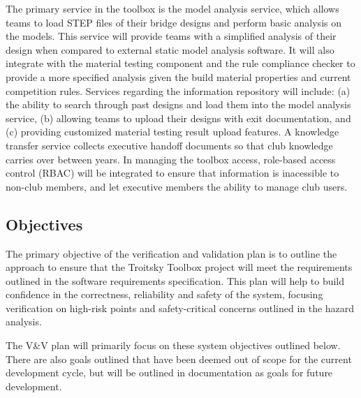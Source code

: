 \documentclass[12pt, titlepage]{article}
\begin{document}
The primary service in the toolbox is the model analysis service, which allows teams to load STEP files of their bridge 
designs and perform basic analysis on the models. This service will provide teams with a simplified analysis of their design when compared to 
external static model analysis software. It will also integrate with the material testing component and the rule compliance checker to provide a more specified analysis given the 
build material properties and current competition rules. Services regarding the information repository will include: (a) the ability to search through past designs and load them into 
the model analysis service, (b) allowing teams to upload their designs with exit documentation, and (c) providing customized material testing result upload features. A knowledge transfer 
service collects executive handoff documents so that club knowledge carries over between years.
In managing the toolbox access, role-based access control (RBAC) will be integrated to ensure that information is inacessible to non-club members, and let executive members 
the ability to manage club users.

\subsection{Objectives}

The primary objective of the verification and validation plan is to outline the approach to ensure that the Troitsky Toolbox 
project will meet the requirements outlined in the software requirements specification. This plan will help to build 
confidence in the correctness, reliability and safety of the system, focusing verification on high-risk points and safety-critical concerns 
outlined in the hazard analysis.

The V\&V plan will primarily focus on these system objectives outlined below. There are also goals outlined that have been deemed 
out of scope for the current development cycle, but will be outlined in documentation as goals for future development.
\end{document}
